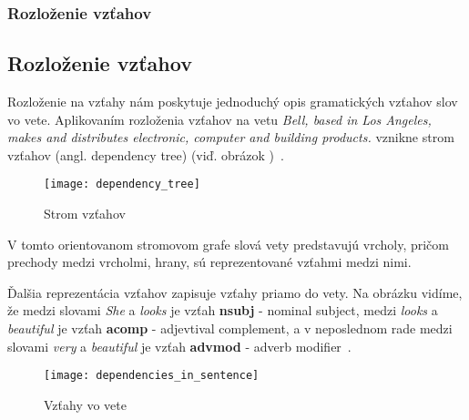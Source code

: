 %
%
{
	\subsubsection{Rozloženie vzťahov}
}
{
	\subsection{Rozloženie vzťahov}
}
\label{subsubsec:dependencyparsing}
Rozloženie na vzťahy nám poskytuje jednoduchý opis gramatických vzťahov slov vo vete. Aplikovaním rozloženia vzťahov na vetu \textit{Bell, based in Los
Angeles, makes and distributes electronic, computer and building products.
} vznikne strom vzťahov (angl. dependency tree) (viď. obrázok )~\cite{StanfordDepManual}.

\begin{figure}[H]
\begin{center}\texttt{[image: dependency\_tree]}\end{center}
\caption[Strom vzťahov]{Strom vzťahov}\label{fig:dependency_tree}
\end{figure}

V tomto orientovanom stromovom grafe slová vety predstavujú vrcholy, pričom prechody medzi vrcholmi, hrany, sú reprezentované vzťahmi medzi nimi.

Ďalšia reprezentácia vzťahov zapisuje vzťahy priamo do vety. Na obrázku  vidíme, že medzi slovami \textit{She} a \textit{looks} je vzťah \textbf{nsubj} - nominal subject, medzi \textit{looks} a \textit{beautiful} je vzťah \textbf{acomp} - adjevtival complement, a v neposlednom rade medzi slovami \textit{very} a \textit{beautiful} je vzťah \textbf{advmod} - adverb modifier~\cite{StanfordDepManual}.

\begin{figure}[H]
\begin{center}\texttt{[image: dependencies\_in\_sentence]}\end{center}
\caption[Vzťahy vo vete]{Vzťahy vo vete}\label{fig:dependencies_in_sentence}
\end{figure}

